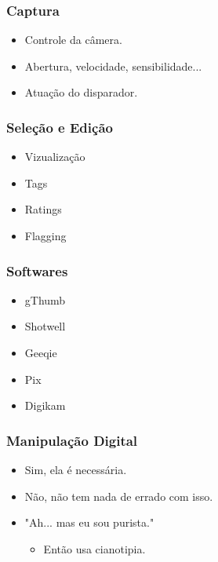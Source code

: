 
\begin{frame}
    \frametitle{Captura}
    \begin{itemize}
        \item Controle da câmera.
        \item Abertura, velocidade, sensibilidade...
        \item Atuação do disparador.
    \end{itemize}
\end{frame}


\begin{frame}
    \frametitle{Seleção e Edição}
    \begin{itemize}
        \item Vizualização
        \item Tags
        \item Ratings
        \item Flagging
    \end{itemize}
\end{frame}

\begin{frame}
    \frametitle{Softwares}
    \begin{itemize}
        \item gThumb
        \item Shotwell
        \item Geeqie
        \item Pix
        \item Digikam
    \end{itemize}
\end{frame}


\begin{frame}
    \frametitle{Manipulação Digital}
    \begin{itemize}
        \item Sim, ela é necessária.
        \item Não, não tem nada de errado com isso.
        \vfill
        \item "Ah... mas eu sou purista."
        \begin{itemize}
            \item Então usa cianotipia.
        \end{itemize}
    \end{itemize}
\end{frame}

